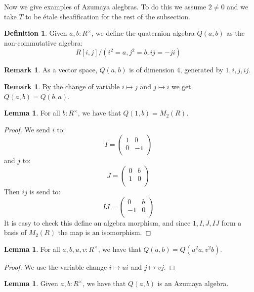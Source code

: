 \documentclass[10pt,a4paper]{article}
\theoremstyle{definition}
\newtheorem{lemma}[theorem]{Lemma}
\newtheorem{definition}[theorem]{Definition}
\newtheorem{remark}[theorem]{Remark}
\begin{document}
Now we give examples of Azumaya alegbras. To do this we assume $2\not=0$ and we take $T$ to be étale sheafification for the rest of the subsection.

\begin{definition}
Given $a,b:R^\times$, we define the quaternion algebra $Q(a,b)$ as the non-commutative algebra:
\[R[i,j]/(i^2=a,j^2=b,ij=-ji)\] 
\end{definition}

\begin{remark}
As a vector space, $Q(a,b)$ is of dimension $4$, generated by $1,i,j,ij$.
\end{remark}

\begin{remark}
By the change of variable $i\mapsto j$ and $j\mapsto i$ we get $Q(a,b) = Q(b,a)$.
\end{remark}

\begin{lemma}\label{quaternion-split}
For all $b:R^\times$, we have that $Q(1,b) = M_2(R)$.
\end{lemma}

\begin{proof}
We send $i$ to:
\[I = \begin{pmatrix}
1 & 0\\
0 & -1\\
\end{pmatrix}\]
and $j$ to:
\[J = \begin{pmatrix}
0 & b\\
1 & 0\\
\end{pmatrix}\]
Then $ij$ is send to:
\[IJ = \begin{pmatrix}
0 & b\\
-1 & 0\\
\end{pmatrix}\]
It is easy to check this define an algebra morphism, and since $1,I,J,IJ$ form a basis of $M_2(R)$ the map is an isomorphism.
\end{proof}

\begin{lemma}\label{quaternion-change-variable}
For all $a,b,u,v:R^\times$, we have that $Q(a,b) = Q(u^2a,v^2b)$.
\end{lemma}

\begin{proof}
We use the variable change $i\mapsto ui$ and $j\mapsto vj$.
\end{proof}

\begin{lemma}
Given $a,b:R^\times$, we have that $Q(a,b)$ is an Azumaya algebra. 
\end{lemma}
\end{document}
